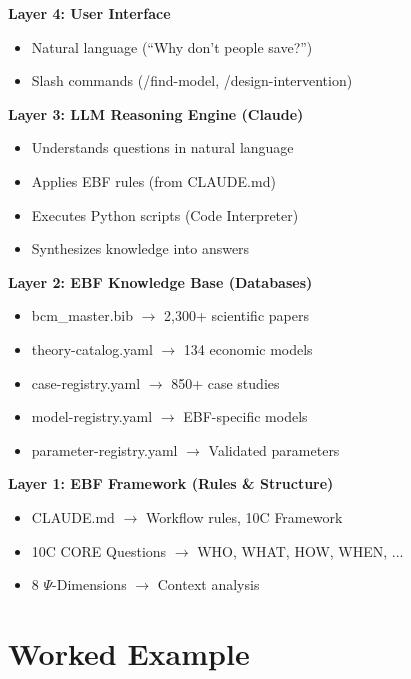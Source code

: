 \begin{tcolorbox}[colback=purple!5!white, colframe=purple!75!black,
    title=EBF Architecture]

\textbf{Layer 4: User Interface}
\begin{itemize}[nosep]
\item Natural language (``Why don't people save?'')
\item Slash commands (/find-model, /design-intervention)
\end{itemize}

\textbf{Layer 3: LLM Reasoning Engine (Claude)}
\begin{itemize}[nosep]
\item Understands questions in natural language
\item Applies EBF rules (from CLAUDE.md)
\item Executes Python scripts (Code Interpreter)
\item Synthesizes knowledge into answers
\end{itemize}

\textbf{Layer 2: EBF Knowledge Base (Databases)}
\begin{itemize}[nosep]
\item bcm\_master.bib $\rightarrow$ 2,300+ scientific papers
\item theory-catalog.yaml $\rightarrow$ 134 economic models
\item case-registry.yaml $\rightarrow$ 850+ case studies
\item model-registry.yaml $\rightarrow$ EBF-specific models
\item parameter-registry.yaml $\rightarrow$ Validated parameters
\end{itemize}

\textbf{Layer 1: EBF Framework (Rules \& Structure)}
\begin{itemize}[nosep]
\item CLAUDE.md $\rightarrow$ Workflow rules, 10C Framework
\item 10C CORE Questions $\rightarrow$ WHO, WHAT, HOW, WHEN, ...
\item 8 $\Psi$-Dimensions $\rightarrow$ Context analysis
\end{itemize}

\end{tcolorbox}


\section{Worked Example}
\label{sec:ref-ebf-example}

